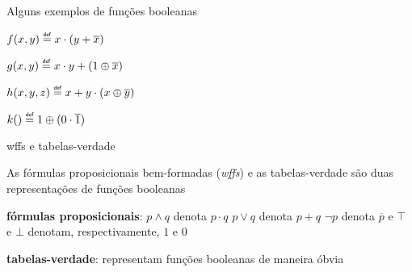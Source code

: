 \expandafter\documentclass\expandafter[table, usenames, svgnames, dvipsnames,14pt, \classopts]{beamer}
\newcommand\defeq{\mathrel{\overset{\makebox[0pt]{\mbox{\normalfont\tiny\sffamily def}}}{=}}}
\begin{document}
\begin{frame}{Alguns exemplos de funções booleanas}

    \begin{outline}[enumerate]
        \1 $f(x,y) \defeq x \cdot (y + \overline{x})$
            
        \vspace{1em}
            
        \1 $g(x,y) \defeq x \cdot y + (1 \oplus \overline{x})$

        \vspace{1em}

        \1 $h(x,y,z) \defeq x + y \cdot (x \oplus \overline{y})$

        \vspace{1em}

        \1 $k() \defeq 1 \oplus (0 \cdot \overline{1})$
    \end{outline}        

\end{frame}

\begin{frame}{wffs e tabelas-verdade}

    As fórmulas proposicionais bem-formadas (\textit{wffs}) e as tabelas-verdade são duas representações de funções booleanas

    \begin{outline}
        \1 \textbf{fórmulas proposicionais}:
            \2[-] $p \land q$ denota $p \cdot q$
            \2[-] $p \lor q$ denota $p + q$
            \2[-] $\lnot{p}$ denota $\overline{p}$
            \2[-] e $\top$ e $\bot$ denotam, respectivamente, $1$ e $0$
        
        \vspace{1em}
        
        \1 \textbf{tabelas-verdade}: representam funções booleanas de maneira óbvia
    \end{outline}        
            
\end{frame}
\end{document}
